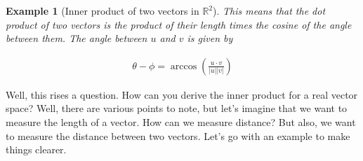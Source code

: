 \documentclass{book}
\newtheorem{example}{Example}[section]
\begin{document}
\begin{example}[Inner product of two vectors in $\mathbb{R}^{2}$]
    This means that the dot product of two vectors is the product of their length
    times the cosine of the angle between them. The angle between $u$ and $v$ is
    given by

    \begin{equation}
        \begin{split}
            \theta - \phi = \arccos{\left(\frac{u\cdot v}{|u| |v|}\right)}
        \end{split}
    \end{equation}

\end{example}

Well, this rises a question. How can you derive the inner product for a real
vector space? Well, there are various points to note, but let's imagine that we
want to measure the length of a vector. How can we measure distance? But also,
we want to measure the distance between two vectors. Let's go with an example
to make things clearer.
\end{document}
